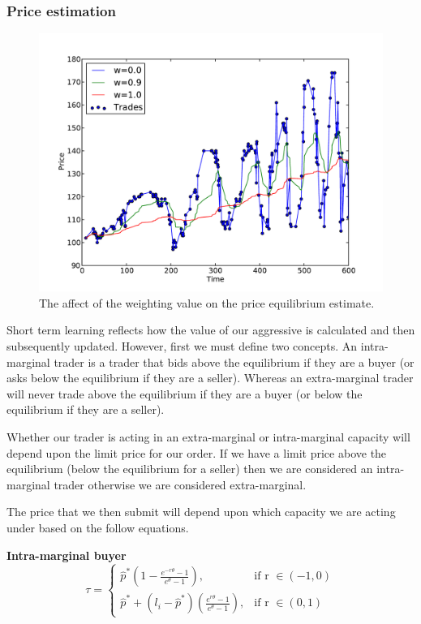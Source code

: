 \documentclass{acm_proc_article-sp}
\begin{document}
\subsubsection{Price estimation} \label{sec:AA_price_estimation}

\begin{figure}
  \centering
  \includegraphics[width=\columnwidth]{graphs_and_stats/equilibriums.pdf}
  \caption{The affect of the weighting value on the price equilibrium
  estimate.}
\end{figure}

Short term learning reflects how the value of our aggressive is calculated and
then subsequently updated. However, first we must define two concepts. An
intra-marginal trader is a trader that bids above the equilibrium if they are a
buyer (or asks below the equilibrium if they are a seller). Whereas an
extra-marginal trader will never trade above the equilibrium if they are a
buyer (or below the equilibrium if they are a seller).

Whether our trader is acting in an extra-marginal or intra-marginal capacity
will depend upon the limit price for our order. If we have a limit price above
the equilibrium (below the equilibrium for a seller) then we are considered an
intra-marginal trader otherwise we are considered extra-marginal.

The price that we then submit will depend upon which capacity we are acting
under based on the follow equations.

\textbf{Intra-marginal buyer}
\begin{equation}
\tau =
\begin{cases}
      \hat{p}^*(1- \frac{e^{-r\theta}-1}{e^{\theta}-1}), &  \text{if r } \in (-1,0)  \\
      \hat{p}^* + (l_i-\hat{p}^*)(\frac{e^{r\theta}-1}{e^\theta-1}), & \text{if
      r } \in (0,1)
\end{cases}
\label{intrabuyer}
\end{equation}
\end{document}
